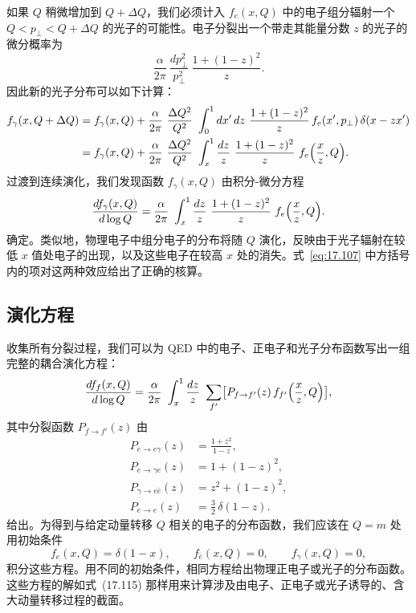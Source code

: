 如果 $Q$ 稍微增加到 $Q + \Delta Q$，我们必须计入 $f_e(x, Q)$ 中的电子组分辐射一个 $Q < p_\perp < Q + \Delta Q$ 的光子的可能性。电子分裂出一个带走其能量分数 $z$ 的光子的微分概率为
\begin{equation}
  \frac{\alpha}{2\pi}\ \frac{dp_\perp^2}{p_\perp^2}\ \frac{1+(1-z)^2}{z} .
  \label{eq:17.110}
\end{equation}
因此新的光子分布可以如下计算：
\begin{equation}
  \begin{aligned}
    f_\gamma(x, Q + \Delta Q) &= f_\gamma(x, Q) + \frac{\alpha}{2\pi}\
      \frac{\Delta Q^2}{Q^2}\ \int_0^1 dx'\,dz\ \frac{1+(1-z)^2}{z}\,
      f_e(x', p_\perp)\,\delta(x - zx')\\
    &= f_\gamma(x, Q) + \frac{\alpha}{2\pi}\ \frac{\Delta Q^2}{Q^2}\
      \int_x^1 \frac{dz}{z}\ \frac{1+(1-z)^2}{z}\ f_e\Bigl(
        \frac{x}{z}, Q \Bigr) .
  \end{aligned}
  \label{eq:17.111}
\end{equation}
过渡到连续演化，我们发现函数 $f_\gamma(x, Q)$ 由积分-微分方程
\begin{equation}
  \frac{df_\gamma(x, Q)}{d\log Q} = \frac{\alpha}{2\pi}\ \int_x^1 \frac{dz}{z}\
    \frac{1+(1-z)^2}{z}\ f_e\Bigl( \frac{x}{z}, Q \Bigr) .
  \label{eq:17.112}
\end{equation}
确定。类似地，物理电子中组分电子的分布将随 $Q$ 演化，反映由于光子辐射在较低 $x$ 值处电子的出现，以及这些电子在较高 $x$ 处的消失。式~\eqref{eq:17.107} 中方括号内的项对这两种效应给出了正确的核算。

\subsection{演化方程}

收集所有分裂过程，我们可以为 QED 中的电子、正电子和光子分布函数写出一组完整的耦合演化方程：
\begin{equation}
  \frac{df_f(x,Q)}{d\log Q} = \frac{\alpha}{2\pi}\ \int_x^1 \frac{dz}{z}\
    \sum_{f'} \bigl[ P_{f\to f'}(z)\,f_{f'}\Bigl( \frac{x}{z}, Q \Bigr)
    \bigr] ,
  \label{eq:17.120}
\end{equation}
其中分裂函数 $P_{f\to f'}(z)$ 由
\begin{equation}
  \begin{aligned}
    P_{e\to e\gamma}(z) &= \frac{1+z^2}{1-z},\\
    P_{e\to \gamma e}(z) &= 1 + (1-z)^2,\\
    P_{\gamma\to e\bar{e}}(z) &= z^2 + (1-z)^2,\\
    P_{e\to e}(z) &= \frac{3}{2}\,\delta(1-z) .
  \end{aligned}
  \label{eq:17.121}
\end{equation}
给出。为得到与给定动量转移 $Q$ 相关的电子的分布函数，我们应该在 $Q = m$ 处用初始条件
\begin{equation}
  f_e(x,Q) = \delta(1-x),\qquad f_{\bar{e}}(x,Q) = 0,\qquad
  f_\gamma(x,Q) = 0 ,
  \label{eq:17.122}
\end{equation}
积分这些方程。用不同的初始条件，相同方程给出物理正电子或光子的分布函数。这些方程的解如式~(17.115) 那样用来计算涉及由电子、正电子或光子诱导的、含大动量转移过程的截面。

